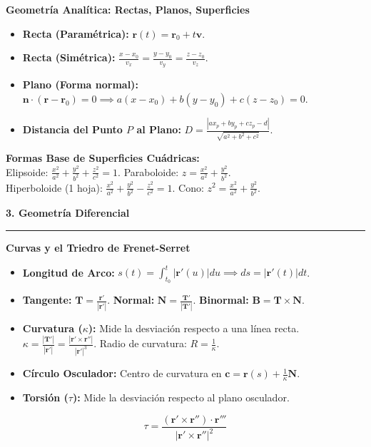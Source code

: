 \documentclass[10pt, landscape, twocolumn]{article}
\newcommand{\cheatsheetsection}[1]{
    \vspace{0.8em}
    {\color{themeblue}\large\bfseries #1} \par
    \vspace{-0.4em}
    {\color{themeblue}\rule{\linewidth}{1pt}} \par
    \vspace{0.3em}
}
\newcommand{\cheatsheetsubsection}[1]{
    \vspace{0.5em}
    {\color{themeblue}\normalsize\bfseries #1} \par
    \vspace{0.2em}
}
\begin{document}
\cheatsheetsubsection{Geometría Analítica: Rectas, Planos, Superficies}
\begin{itemize}[leftmargin=*, nosep]
    \item \textbf{Recta (Paramétrica):} $\mathbf{r}(t) = \mathbf{r}_0 + t\mathbf{v}$.
    \item \textbf{Recta (Simétrica):} $\frac{x-x_0}{v_x} = \frac{y-y_0}{v_y} = \frac{z-z_0}{v_z}$.
    \item \textbf{Plano (Forma normal):} $\mathbf{n} \cdot (\mathbf{r} - \mathbf{r}_0) = 0 \implies a(x-x_0) + b(y-y_0) + c(z-z_0) = 0$.
    \item \textbf{Distancia del Punto $P$ al Plano:} $D = \frac{|ax_p + by_p + cz_p - d|}{\sqrt{a^2+b^2+c^2}}$.
\end{itemize}

\newpage
\textbf{Formas Base de Superficies Cuádricas:}\\
Elipsoide: $\frac{x^2}{a^2} + \frac{y^2}{b^2} + \frac{z^2}{c^2} = 1$. Paraboloide: $z = \frac{x^2}{a^2} + \frac{y^2}{b^2}$.\\
Hiperboloide (1 hoja): $\frac{x^2}{a^2} + \frac{y^2}{b^2} - \frac{z^2}{c^2} = 1$. Cono: $z^2 = \frac{x^2}{a^2} + \frac{y^2}{b^2}$.

\cheatsheetsection{3. Geometría Diferencial}

\cheatsheetsubsection{Curvas y el Triedro de Frenet-Serret}
\begin{itemize}[leftmargin=*, nosep]
    \item \textbf{Longitud de Arco:} $s(t) = \int_{t_0}^t |\mathbf{r}'(u)| du \implies ds = |\mathbf{r}'(t)|dt$.
    \item \textbf{Tangente:} $\mathbf{T} = \frac{\mathbf{r}'}{|\mathbf{r}'|}$. \quad \textbf{Normal:} $\mathbf{N} = \frac{\mathbf{T}'}{|\mathbf{T}'|}$. \quad \textbf{Binormal:} $\mathbf{B} = \mathbf{T} \times \mathbf{N}$.
    \item \textbf{Curvatura ($\kappa$):} Mide la desviación respecto a una línea recta. \\ $\kappa = \frac{|\mathbf{T}'|}{|\mathbf{r}'|} = \frac{|\mathbf{r}' \times \mathbf{r}''|}{|\mathbf{r}'|^3}$. Radio de curvatura: $R = \frac{1}{\kappa}$.
    \item \textbf{Círculo Osculador:} Centro de curvatura en $\mathbf{c} = \mathbf{r}(s) + \frac{1}{\kappa}\mathbf{N}$.
    \item \textbf{Torsión ($\tau$):} Mide la desviación respecto al plano osculador.
\end{itemize}
\[
\tau = \frac{(\mathbf{r}' \times \mathbf{r}'') \cdot \mathbf{r}'''}{|\mathbf{r}' \times \mathbf{r}''|^2}
\]
\end{document}
